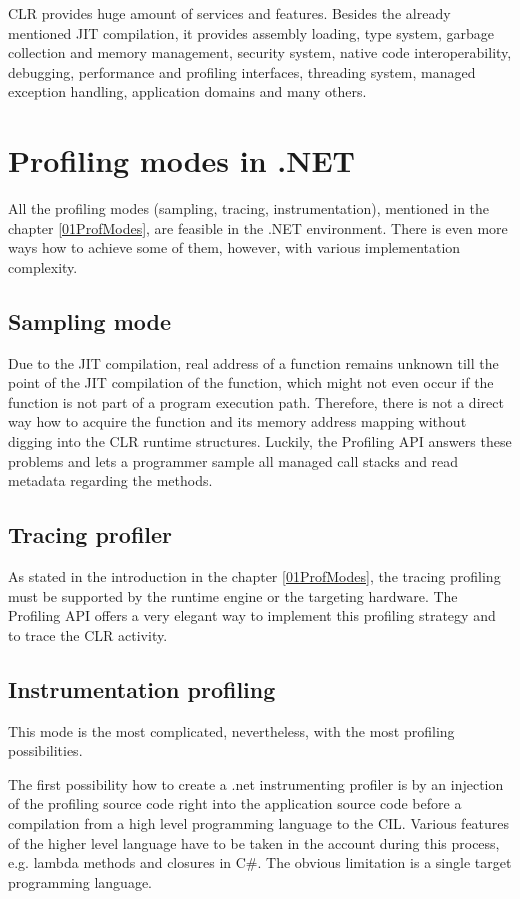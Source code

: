 CLR provides huge amount of services and features. Besides the already mentioned JIT compilation, it provides assembly loading, type system, garbage collection and memory management, security system, native code interoperability, debugging, performance and profiling interfaces, threading system, managed exception handling, application domains and many others.

\section{Profiling modes in .NET}
All the profiling modes (sampling, tracing, instrumentation), mentioned in the chapter \ref{01ProfModes}, are feasible in the .NET environment. There is even more ways how to achieve some of them, however, with various implementation complexity. 

\subsection{Sampling mode}
Due to the JIT compilation, real address of a function remains unknown till the point of the JIT compilation of the function, which might not even occur if the function is not part of a program execution path. Therefore, there is not a direct way how to acquire the function and its memory address mapping without digging into the CLR runtime structures. Luckily, the Profiling API answers these problems and lets a programmer sample all managed call stacks and read metadata regarding the methods.

\subsection{Tracing profiler}
As stated in the introduction in the chapter \ref{01ProfModes}, the tracing profiling must be supported by the runtime engine or the targeting hardware. The Profiling API offers a very elegant way to implement this profiling strategy and to trace the CLR activity.

\subsection{Instrumentation profiling}
This mode is the most complicated, nevertheless, with the most profiling possibilities. 

The first possibility how to create a .net instrumenting profiler is by an injection of the profiling source code right into the application source code before a compilation from a high level programming language to the CIL. Various features of the higher level language have to be taken in the account during this process, e.g. lambda methods and closures in C\#. The obvious limitation is a single target programming language.

